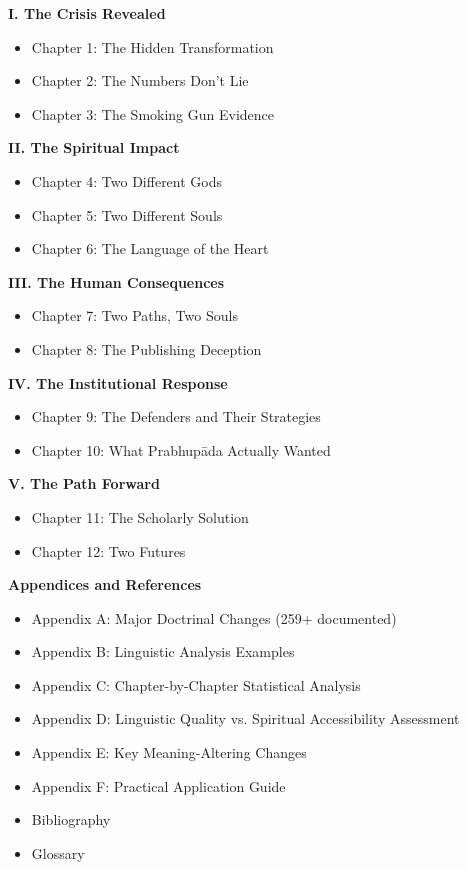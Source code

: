 \documentclass[11pt,twoside]{book}
\begin{document}
\textbf{I.  The Crisis Revealed}
\begin{itemize}
\item Chapter 1: The Hidden Transformation
\item Chapter 2: The Numbers Don't Lie
\item Chapter 3: The Smoking Gun Evidence
\end{itemize}

\textbf{II.  The Spiritual Impact}
\begin{itemize}
\item Chapter 4: Two Different Gods
\item Chapter 5: Two Different Souls
\item Chapter 6: The Language of the Heart
\end{itemize}

\textbf{III.  The Human Consequences}
\begin{itemize}
\item Chapter 7: Two Paths, Two Souls
\item Chapter 8: The Publishing Deception
\end{itemize}

\textbf{IV.  The Institutional Response}
\begin{itemize}
\item Chapter 9: The Defenders and Their Strategies
\item Chapter 10: What Prabhupāda Actually Wanted
\end{itemize}

\newpage
\thispagestyle{empty}

\textbf{V.  The Path Forward}
\begin{itemize}
\item Chapter 11: The Scholarly Solution
\item Chapter 12: Two Futures
\end{itemize}

\textbf{Appendices and References}
\begin{itemize}
\item Appendix A: Major Doctrinal Changes (259+ documented)
\item Appendix B: Linguistic Analysis Examples
\item Appendix C: Chapter-by-Chapter Statistical Analysis
\item Appendix D: Linguistic Quality vs. Spiritual Accessibility Assessment
\item Appendix E: Key Meaning-Altering Changes
\item Appendix F: Practical Application Guide
\item Bibliography
\item Glossary
\end{itemize}
\end{document}
